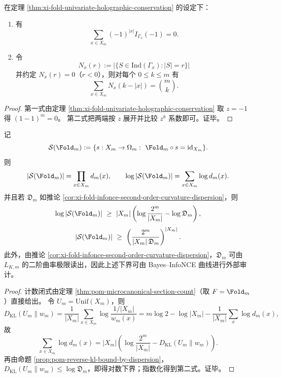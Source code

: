 \begin{corollary}[在 \texorpdfstring{$z=-1$}{z=-1} 处的消去与二项卷积约束]\label{cor:xi-fold-zminusone-cancellation-binomial-convolution}
在定理 \ref{thm:xi-fold-univariate-holographic-conservation} 的设定下：
\begin{enumerate}
  \item 有
  \[
  \sum_{x\in X_m}(-1)^{|x|}I_{\Gamma_x}(-1)=0.
  \]
  \item 令
  \[
  N_x(r):=\bigl|\{S\in\mathrm{Ind}(\Gamma_x): |S|=r\}\bigr|
  \]
  并约定 \(N_x(r)=0\)（\(r<0\)），则对每个 \(0\le k\le m\) 有
  \[
  \sum_{x\in X_m}N_x(k-|x|)=\binom{m}{k}.
  \]
\end{enumerate}
\end{corollary}
\begin{proof}
第一式由定理 \ref{thm:xi-fold-univariate-holographic-conservation} 取 \(z=-1\) 得
\(
(1-1)^m=0
\)。
第二式把两端按 \(z\) 展开并比较 \(z^k\) 系数即可。证毕。
\end{proof}

\begin{proposition}[右逆空间的指数下界与二阶曲率可审计证书]\label{prop:xi-fold-right-inverse-count-dispersion-lowerbound}
记
\[
\mathcal S(\Fold_m):=\{s:X_m\to\Omega_m:\ \Fold_m\circ s=\mathrm{id}_{X_m}\}.
\]
则
\[
|\mathcal S(\Fold_m)|=\prod_{x\in X_m} d_m(x),
\qquad
\log |\mathcal S(\Fold_m)|=\sum_{x\in X_m}\log d_m(x).
\]
并且若 \(\mathfrak D_m\) 如推论 \ref{cor:xi-fold-infonce-second-order-curvature-dispersion}，则
\[
\log |\mathcal S(\Fold_m)|
\ \ge\
|X_m|\left(\log\frac{2^m}{|X_m|}-\log\mathfrak D_m\right),
\]
\[
|\mathcal S(\Fold_m)|
\ \ge\
\left(\frac{2^m}{|X_m|\,\mathfrak D_m}\right)^{|X_m|}.
\]
此外，由推论 \ref{cor:xi-fold-infonce-second-order-curvature-dispersion}，\(\mathfrak D_m\) 可由 \(L_{K,m}\) 的二阶曲率极限读出，因此上述下界可由 Bayes--InfoNCE 曲线进行外部审计。
\end{proposition}
\begin{proof}
计数闭式由定理 \ref{thm:pom-microcanonical-section-count}（取 \(F=\Fold_m\)）直接给出。
令 \(U_m=\mathrm{Unif}(X_m)\)，则
\[
D_{\mathrm{KL}}(U_m\|w_m)
=\frac1{|X_m|}\sum_{x\in X_m}\log\frac{1/|X_m|}{w_m(x)}
=m\log2-\log|X_m|-\frac{1}{|X_m|}\sum_x\log d_m(x),
\]
故
\[
\sum_{x\in X_m}\log d_m(x)
=|X_m|\left(\log\frac{2^m}{|X_m|}-D_{\mathrm{KL}}(U_m\|w_m)\right).
\]
再由命题 \ref{prop:pom-reverse-kl-bound-by-dispersion}，
\(
D_{\mathrm{KL}}(U_m\|w_m)\le \log\mathfrak D_m
\)，即得对数下界；指数化得到第二式。证毕。
\end{proof}

\endinput
